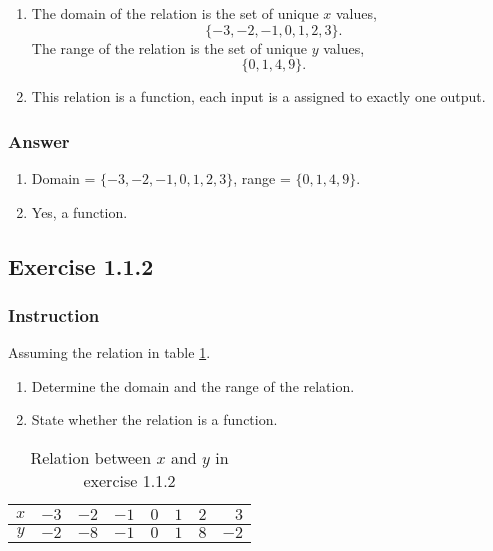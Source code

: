 \documentclass[11pt, letterpaper, oneside]{memoir}
\begin{document}
\begin{enumerate}[label=(\alph*)]
  \item The domain of the relation is the set of unique $ x $ values,
    $$ \phantom{.}
    \{ -3, -2, -1, 0, 1, 2, 3 \}
    .$$
    The range of the relation is the set of unique $ y $ values,
    $$ \phantom{.}
    \{ 0, 1, 4, 9 \}
    .$$
  \item This relation is a function, each input is a assigned to exactly one output.
\end{enumerate}

\subsubsection{Answer}

\begin{enumerate}[label=(\alph*)]
  \item Domain = $ \{ -3, -2, -1, 0, 1, 2, 3 \} $, range = $ \{ 0, 1, 4, 9 \} $.
  \item Yes, a function.
\end{enumerate}

\subsection*{Exercise 1.1.2}

\subsubsection{Instruction}

Assuming the relation in table \ref{table:exercise-1.1.2}.
\begin{enumerate}[label=(\alph*)]
  \item Determine the domain and the range of the relation.
  \item State whether the relation is a function.
\end{enumerate}

\begin{table}[ht]
  \centering
  \begin{tabular}{ c | r r r r r r r }
    \hline
    $ x $ & $ -3 $ & $ -2 $ & $ -1 $ & $ 0 $ & $ 1 $ & $ 2 $ & $ 3 $ \\
    \hline
    $ y $ & $ -2 $ & $ -8 $ & $ -1 $ & $ 0 $ & $ 1 $ & $ 8 $ & $ -2 $ \\
    \hline
  \end{tabular}
  \caption{Relation between $ x $ and $ y $ in exercise 1.1.2}
  \label{table:exercise-1.1.2}
\end{table}
\end{document}
